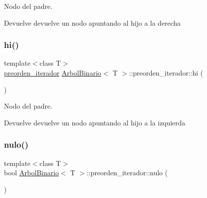 Nodo del padre. 

\begin{DoxyReturn}{Devuelve}
devuelve un nodo apuntando al hijo a la derecha 
\end{DoxyReturn}
\mbox{\label{classArbolBinario_1_1preorden__iterador_ab5544b595b19971dd01fea9db98de720}} 
\subsubsection{\texorpdfstring{hi()}{hi()}}
{\footnotesize\ttfamily template$<$class T$>$ \\
\hyperlink{classArbolBinario_1_1preorden__iterador}{preorden\+\_\+iterador} \hyperlink{classArbolBinario}{Arbol\+Binario}$<$ T $>$\+::preorden\+\_\+iterador\+::hi (\begin{DoxyParamCaption}{ }\end{DoxyParamCaption})\hspace{0.3cm}{\ttfamily [inline]}}



Nodo del padre. 

\begin{DoxyReturn}{Devuelve}
devuelve un nodo apuntando al hijo a la izquierda 
\end{DoxyReturn}
\mbox{\label{classArbolBinario_1_1preorden__iterador_afd2b641bb148fddafb617ea0af3e174c}} 
\subsubsection{\texorpdfstring{nulo()}{nulo()}}
{\footnotesize\ttfamily template$<$class T$>$ \\
bool \hyperlink{classArbolBinario}{Arbol\+Binario}$<$ T $>$\+::preorden\+\_\+iterador\+::nulo (\begin{DoxyParamCaption}{ }\end{DoxyParamCaption})\hspace{0.3cm}{\ttfamily [inline]}}



